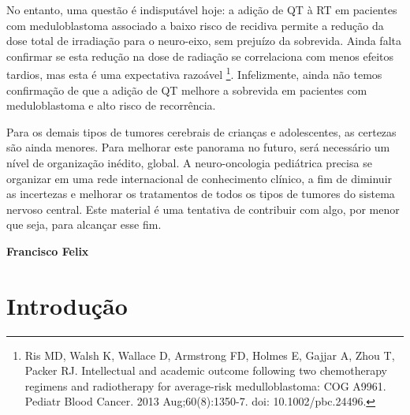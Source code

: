 \documentclass[11pt,a4paper,oldfontcommands]{memoir}
\begin{document}
No entanto, uma questão é indisputável hoje: a adição de QT à RT em pacientes com meduloblastoma associado a  baixo risco de recidiva permite a redução da dose total de irradiação para o neuro-eixo, sem prejuízo da sobrevida. Ainda falta confirmar se esta redução na dose de radiação se correlaciona com menos efeitos tardios, mas esta é uma expectativa razoável \footnote{Ris MD, Walsh K, Wallace D, Armstrong FD, Holmes E, Gajjar A, Zhou T, Packer RJ. Intellectual and academic outcome following two chemotherapy regimens and radiotherapy for average-risk medulloblastoma: COG A9961. Pediatr Blood Cancer. 2013 Aug;60(8):1350-7. doi: 10.1002/pbc.24496.}. Infelizmente, ainda não temos confirmação de que a adição de QT melhore a sobrevida em pacientes com meduloblastoma e alto risco de recorrência.

Para os demais tipos de tumores cerebrais de crianças e adolescentes, as certezas são ainda menores. Para melhorar este panorama no futuro, será necessário um nível de organização inédito, global. A neuro-oncologia pediátrica precisa se organizar em uma rede internacional de conhecimento clínico, a fim de diminuir as incertezas e melhorar os tratamentos de todos os tipos de tumores do sistema nervoso central. Este material é uma tentativa de contribuir com algo, por menor que seja, para alcançar esse fim. 



\begin{flushright}
\textbf{Francisco Felix}
\end{flushright}
\clearpage


\chapter{Introdução}
\end{document}
